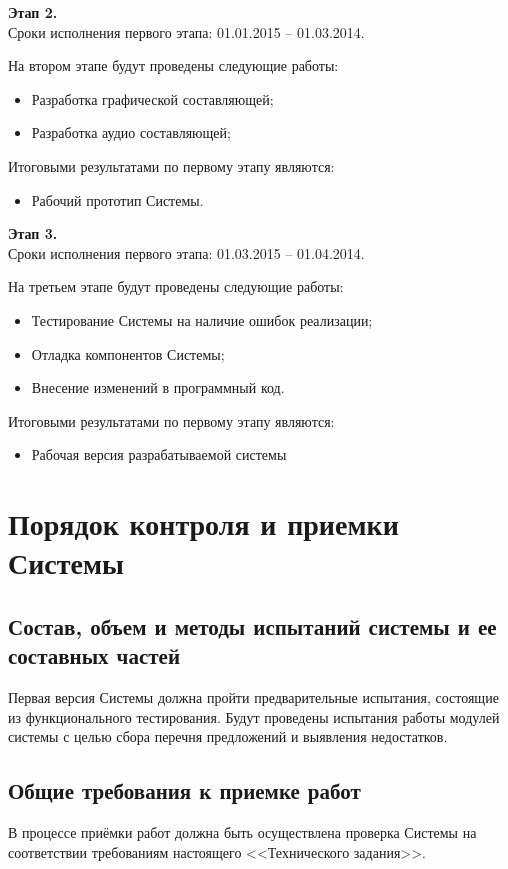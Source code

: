 \textbf{Этап 2.}\\
Сроки исполнения первого этапа: 01.01.2015 -- 01.03.2014.

На втором этапе будут проведены следующие работы:
\begin{itemize}
    \item Разработка графической составляющей;
    \item Разработка аудио составляющей;
\end{itemize}
Итоговыми результатами по первому этапу являются:
\begin{itemize}
    \item Рабочий прототип Системы.
\end{itemize}

\textbf{Этап 3.}\\
Сроки исполнения первого этапа: 01.03.2015 -- 01.04.2014.

На третьем этапе будут проведены следующие работы:
\begin{itemize}
    \item Тестирование Системы на наличие ошибок реализации;
    \item Отладка компонентов Системы;
    \item Внесение изменений в программный код.
\end{itemize}
Итоговыми результатами по первому этапу являются:
\begin{itemize}
    \item Рабочая версия разрабатываемой системы
\end{itemize}

\chapter{Порядок контроля и приемки Системы}
\section{Состав, объем и методы испытаний системы и ее составных частей}
Первая версия Системы должна пройти предварительные испытания, состоящие из функционального 
тестирования. Будут проведены испытания работы модулей системы с целью сбора перечня 
предложений и выявления недостатков. 

\section{Общие требования к приемке работ}
В процессе приёмки работ должна быть осуществлена проверка Системы на соответствии требованиям 
настоящего <<Технического задания>>.


